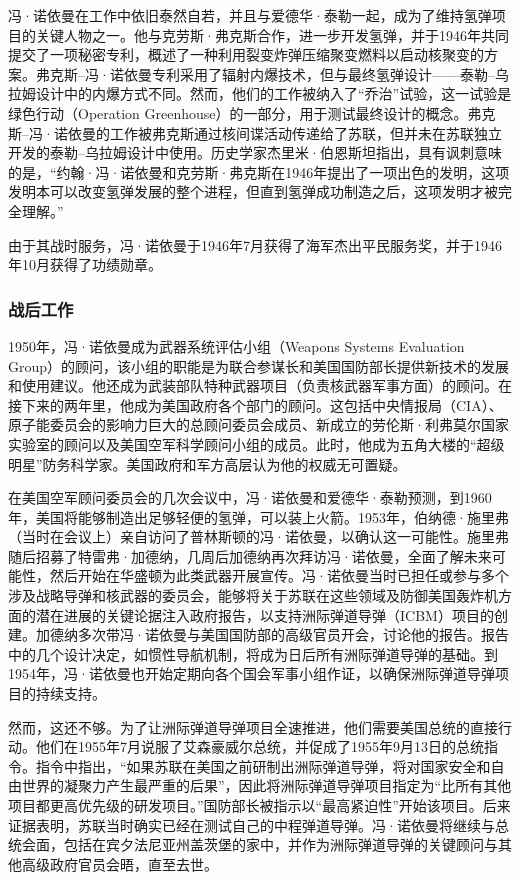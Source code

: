 冯·诺依曼在工作中依旧泰然自若，并且与爱德华·泰勒一起，成为了维持氢弹项目的关键人物之一。他与克劳斯·弗克斯合作，进一步开发氢弹，并于1946年共同提交了一项秘密专利，概述了一种利用裂变炸弹压缩聚变燃料以启动核聚变的方案。弗克斯–冯·诺依曼专利采用了辐射内爆技术，但与最终氢弹设计——泰勒–乌拉姆设计中的内爆方式不同。然而，他们的工作被纳入了“乔治”试验，这一试验是绿色行动（Operation Greenhouse）的一部分，用于测试最终设计的概念。弗克斯–冯·诺依曼的工作被弗克斯通过核间谍活动传递给了苏联，但并未在苏联独立开发的泰勒–乌拉姆设计中使用。历史学家杰里米·伯恩斯坦指出，具有讽刺意味的是，“约翰·冯·诺依曼和克劳斯·弗克斯在1946年提出了一项出色的发明，这项发明本可以改变氢弹发展的整个进程，但直到氢弹成功制造之后，这项发明才被完全理解。”

由于其战时服务，冯·诺依曼于1946年7月获得了海军杰出平民服务奖，并于1946年10月获得了功绩勋章。
\subsubsection{战后工作}  
1950年，冯·诺依曼成为武器系统评估小组（Weapons Systems Evaluation Group）的顾问，该小组的职能是为联合参谋长和美国国防部长提供新技术的发展和使用建议。他还成为武装部队特种武器项目（负责核武器军事方面）的顾问。在接下来的两年里，他成为美国政府各个部门的顾问。这包括中央情报局（CIA）、原子能委员会的影响力巨大的总顾问委员会成员、新成立的劳伦斯·利弗莫尔国家实验室的顾问以及美国空军科学顾问小组的成员。此时，他成为五角大楼的“超级明星”防务科学家。美国政府和军方高层认为他的权威无可置疑。

在美国空军顾问委员会的几次会议中，冯·诺依曼和爱德华·泰勒预测，到1960年，美国将能够制造出足够轻便的氢弹，可以装上火箭。1953年，伯纳德·施里弗（当时在会议上）亲自访问了普林斯顿的冯·诺依曼，以确认这一可能性。施里弗随后招募了特雷弗·加德纳，几周后加德纳再次拜访冯·诺依曼，全面了解未来可能性，然后开始在华盛顿为此类武器开展宣传。冯·诺依曼当时已担任或参与多个涉及战略导弹和核武器的委员会，能够将关于苏联在这些领域及防御美国轰炸机方面的潜在进展的关键论据注入政府报告，以支持洲际弹道导弹（ICBM）项目的创建。加德纳多次带冯·诺依曼与美国国防部的高级官员开会，讨论他的报告。报告中的几个设计决定，如惯性导航机制，将成为日后所有洲际弹道导弹的基础。到1954年，冯·诺依曼也开始定期向各个国会军事小组作证，以确保洲际弹道导弹项目的持续支持。

然而，这还不够。为了让洲际弹道导弹项目全速推进，他们需要美国总统的直接行动。他们在1955年7月说服了艾森豪威尔总统，并促成了1955年9月13日的总统指令。指令中指出，“如果苏联在美国之前研制出洲际弹道导弹，将对国家安全和自由世界的凝聚力产生最严重的后果”，因此将洲际弹道导弹项目指定为“比所有其他项目都更高优先级的研发项目。”国防部长被指示以“最高紧迫性”开始该项目。后来证据表明，苏联当时确实已经在测试自己的中程弹道导弹。冯·诺依曼将继续与总统会面，包括在宾夕法尼亚州盖茨堡的家中，并作为洲际弹道导弹的关键顾问与其他高级政府官员会晤，直至去世。
